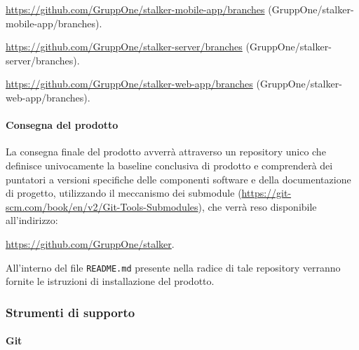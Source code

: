 \documentclass[../../norme-di-progetto.tex]{subfiles}
\begin{document}
\begin{description}
  \item \href{https://github.com/GruppOne/stalker-mobile-app/branches}{https://github.com/GruppOne/stalker-mobile-app/branches} (GruppOne/stalker-mobile-app/branches).
  \item \href{https://github.com/GruppOne/stalker-server/branches}{https://github.com/GruppOne/stalker-server/branches} (GruppOne/stalker-server/branches).
  \item \href{https://github.com/GruppOne/stalker-web-app/branches}{https://github.com/GruppOne/stalker-web-app/branches} (GruppOne/stalker-web-app/branches).
\end{description}


\paragraph{Consegna del prodotto}%
\label{par:consegna_del_prodotto}

La consegna finale del prodotto avverrà attraverso un repository unico che definisce univocamente la baseline conclusiva di prodotto e comprenderà dei puntatori a versioni specifiche delle componenti software e della documentazione di progetto, utilizzando il meccanismo dei submodule (\href{https://git-scm.com/book/en/v2/Git-Tools-Submodules}{https://git-scm.com/book/en/v2/Git-Tools-Submodules}), che verrà reso disponibile all'indirizzo:

\begin{center}
  \href{https://github.com/GruppOne/stalker}{https://github.com/GruppOne/stalker}.
\end{center}

All'interno del file \verb|README.md| presente nella radice di tale repository verranno fornite le istruzioni di installazione del prodotto.


\subsubsection{Strumenti di supporto}%
\label{subs:gestione_della_configurazione/strumenti_di_supporto}

\paragraph{Git}%
\label{par:git}
\end{document}
